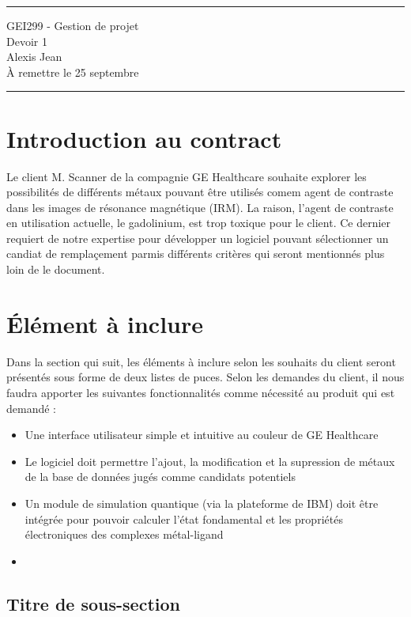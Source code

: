 \documentclass[11pt]{article}
\begin{document}
\hrule

\begin{center}
  {\Large GEI299 - Gestion de projet} \\ \vspace{5mm}
  {\LARGE\sffamily Devoir 1} \\
  Alexis Jean \\
  À remettre le 25 septembre
\end{center}

\hrule


\section{Introduction au contract}
Le client M. Scanner de la compagnie GE Healthcare souhaite explorer les possibilités de différents métaux pouvant être utilisés comem agent de contraste dans les images de résonance magnétique (IRM). La raison, l'agent de contraste en utilisation actuelle, le gadolinium, est trop toxique pour le client. Ce dernier requiert de notre expertise pour développer un logiciel pouvant sélectionner un candiat de remplaçement parmis différents critères qui seront mentionnés plus loin de le document.


\section{Élément à inclure}
Dans la section qui suit, les éléments à inclure selon les souhaits du client seront présentés sous forme de deux listes de puces. Selon les demandes du client, il nous faudra apporter les suivantes fonctionnalités comme nécessité au produit qui est demandé :

\begin{itemize}[label=\textbullet]
  \item Une interface utilisateur simple et intuitive au couleur de GE Healthcare
  \item Le logiciel doit permettre l'ajout, la modification et la supression de métaux de la base de données jugés comme candidats potentiels
  \item Un module de simulation quantique (via la plateforme de IBM) doit être intégrée pour pouvoir calculer l’état fondamental et les propriétés électroniques des complexes métal-ligand
  \item 
\end{itemize}

\subsection{Titre de sous-section}
\end{document}
